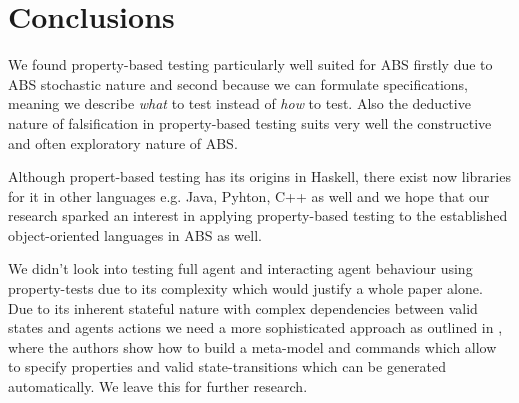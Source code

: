 \section{Conclusions}
\label{sec:conclusions}

We found property-based testing particularly well suited for ABS firstly due to ABS stochastic nature and second because we can formulate specifications, meaning we describe \textit{what} to test instead of \textit{how} to test. Also the deductive nature of falsification in property-based testing suits very well the constructive and often exploratory nature of ABS. 

Although propert-based testing has its origins in Haskell, there exist now libraries for it in other languages e.g. Java, Pyhton, C++ as well and we hope that our research sparked an interest in applying property-based testing to the established object-oriented languages in ABS as well.

We didn't look into testing full agent and interacting agent behaviour using property-tests due to its complexity which would justify a whole paper alone. Due to its inherent stateful nature with complex dependencies between valid states and agents actions we need a more sophisticated approach as outlined in \cite{de_vries_well-typed_2019}, where the authors show how to build a meta-model and commands which allow to specify properties and valid state-transitions which can be generated automatically. We leave this for further research.